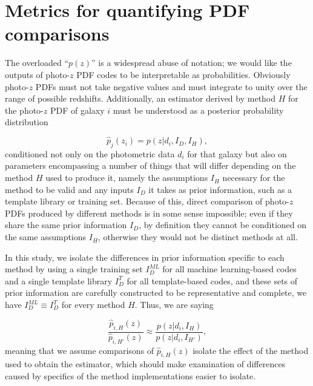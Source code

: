 \section{Metrics for quantifying PDF comparisons}
\label{sec:metrics}


The overloaded ``$p(z)$'' is a widespread abuse of notation; we would like the outputs of photo-$z$ PDF codes to be interpretable as probabilities.
Obviously photo-$z$ PDFs must not take negative values and must integrate to unity over the range of possible redshifts.
Additionally, an estimator derived by method $H$ for the photo-$z$ PDF of galaxy $i$ must be understood as a posterior probability distribution

\begin{equation}
\hat{p}_{j}(z_{i}) = p(z | d_{i}, I_{D}, I_{H}),
\end{equation}
conditioned not only on the photometric data $d_{i}$ for that galaxy but also on parameters encompassing a number of things that will differ depending on the method $H$ used to produce it, namely the assumptions $I_{H}$ necessary for the method to be valid and any inputs $I_{D}$ it takes as prior information, such as a template library or training set.
Because of this, direct comparison of photo-$z$ PDFs produced by different methods is in some sense impossible; even if they share the same prior information $I_{D}$, by definition they cannot be conditioned on the same assumptions $I_{H}$, otherwise they would not be distinct methods at all.

In this study, we isolate the differences in prior information specific to each method by using a single training set $I_{D}^{ML}$ for all machine learning-based codes and a single template library $I_{D}^{T}$ for all template-based codes, and these sets of prior information are carefully constructed to be representative and complete, we have $I_{D}^{ML}\equiv I_{D}^{T}$ for every method $H$.
Thus, we are saying

\begin{equation}
\frac{\hat{p}_{i, H}(z)}{\hat{p}_{i, H'}(z)} \approx \frac{p(z | d_{i}, I_{H})}{p(z | d_{i}, I_{H'})},
\end{equation}
meaning that we assume comparisons of $\hat{p}_{i, H}(z)$ isolate the effect of the method used to obtain the estimator, which should make examination of differences caused by specifics of the method implementations easier to isolate.

